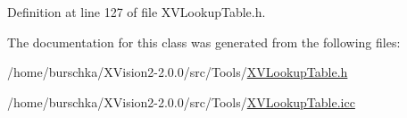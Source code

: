 Definition at line 127 of file XVLookup\-Table.h.

The documentation for this class was generated from the following files:\begin{CompactItemize}
\item 
/home/burschka/XVision2-2.0.0/src/Tools/\hyperlink{XVLookupTable.h-source}{XVLookup\-Table.h}\item 
/home/burschka/XVision2-2.0.0/src/Tools/\hyperlink{XVLookupTable.icc-source}{XVLookup\-Table.icc}\end{CompactItemize}
